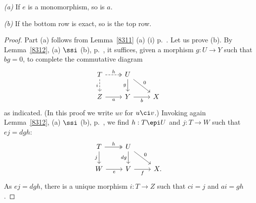 \documentclass[12pt]{article}
\theoremstyle{remark}
\theoremstyle{definition}
\begin{document}
\begin{s}
\begin{lem}
\nn\emph{(a)} If $e$ is a monomorphism, so is $a$.

\nn\emph{(b)} If the bottom row is exact, so is the top row.
\end{lem} 
\begin{proof}
Part (a) follows from Lemma~\ref{8311} (a) (i) p.~. Let us prove (b). By Lemma~\ref{8312}, (a) $\ssi$ (b), p.~, it suffices, given a morphism $g:U\to Y$ such that $bg=0$, to complete the commutative diagram 
$$
\begin{tikzcd}
T\ar[dashed]{d}[swap]{i}\ar[dashed,two heads]{r}{h}&U\ar{dr}{0}\ar{d}[swap]{g}\\ 
Z\ar{r}[swap]{a}&Y\ar{r}[swap]{b}&X
\end{tikzcd}
$$ 
as indicated. (In this proof we write $uv$ for $u\ci v$.) Invoking again Lemma~\ref{8312}, (a) $\ssi$ (b), p.~, we find $h:T\epi U$ and $j:T\to W$ such that $ej=dgh$:
$$
\begin{tikzcd}
T\ar{d}[swap]{j}\ar[two heads]{r}{h}&U\ar{dr}{0}\ar{d}[swap]{dg}\\ 
W\ar{r}[swap]{e}&V\ar{r}[swap]{f}&X.
\end{tikzcd}
$$ 
As $ej=dgh$, there is a unique morphism $i:T\to Z$ such that $ci=j$ and $ai=gh$. 
\end{proof}
\end{s}

%
\end{document}
